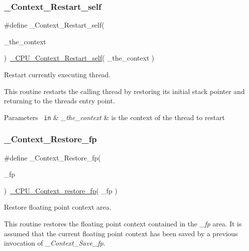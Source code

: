 \subsubsection{\texorpdfstring{\_Context\_Restart\_self}{\_Context\_Restart\_self}}
{\footnotesize\ttfamily \#define \+\_\+\+Context\+\_\+\+Restart\+\_\+self(\begin{DoxyParamCaption}\item[{}]{\+\_\+the\+\_\+context }\end{DoxyParamCaption})~\mbox{\hyperlink{v850_2include_2rtems_2score_2cpu_8h_a3fb67e174d7b61251322cd32126acd1a}{\+\_\+\+C\+P\+U\+\_\+\+Context\+\_\+\+Restart\+\_\+self}}( \+\_\+the\+\_\+context )}



Restart currently executing thread. 

This routine restarts the calling thread by restoring its initial stack pointer and returning to the thread\textquotesingle{}s entry point.


\begin{DoxyParams}[1]{Parameters}
\mbox{\texttt{ in}}  & {\em \+\_\+the\+\_\+context} & is the context of the thread to restart \\
\hline
\end{DoxyParams}
\mbox{\label{group__RTEMSScoreContext_gab2919317d5dbb7a40cfd3371c2195871}} 
\subsubsection{\texorpdfstring{\_Context\_Restore\_fp}{\_Context\_Restore\_fp}}
{\footnotesize\ttfamily \#define \+\_\+\+Context\+\_\+\+Restore\+\_\+fp(\begin{DoxyParamCaption}\item[{}]{\+\_\+fp }\end{DoxyParamCaption})~\mbox{\hyperlink{sparc_2include_2rtems_2score_2cpu_8h_a8d77a957f827a9250794f9ad754acbf5}{\+\_\+\+C\+P\+U\+\_\+\+Context\+\_\+restore\+\_\+fp}}( \+\_\+fp )}



Restore floating point context area. 

This routine restores the floating point context contained in the {\itshape \+\_\+fp} area. It is assumed that the current floating point context has been saved by a previous invocation of {\itshape \+\_\+\+Context\+\_\+\+Save\+\_\+fp}.


